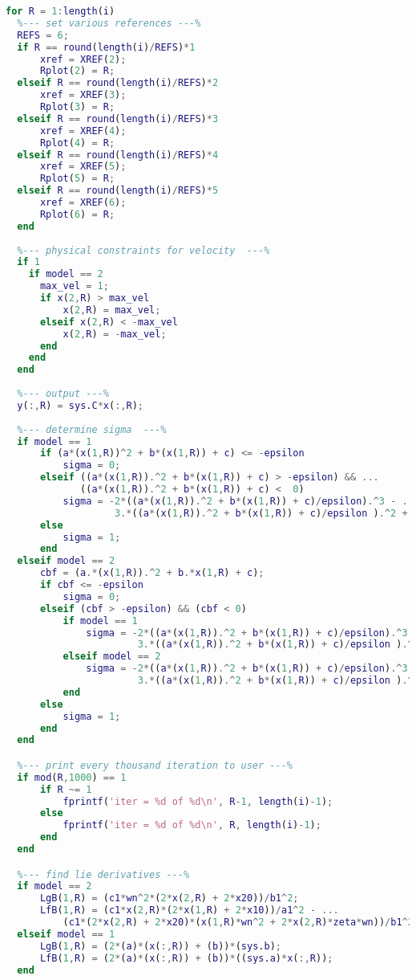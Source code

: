 \begin{lstlisting}[language=matlab]
for R = 1:length(i)
  %--- set various references ---%
  REFS = 6;
  if R == round(length(i)/REFS)*1
      xref = XREF(2);
      Rplot(2) = R;
  elseif R == round(length(i)/REFS)*2
      xref = XREF(3);
      Rplot(3) = R;
  elseif R == round(length(i)/REFS)*3
      xref = XREF(4);
      Rplot(4) = R;
  elseif R == round(length(i)/REFS)*4
      xref = XREF(5);
      Rplot(5) = R;
  elseif R == round(length(i)/REFS)*5
      xref = XREF(6);
      Rplot(6) = R;
  end
  
  %--- physical constraints for velocity  ---%
  if 1
    if model == 2
      max_vel = 1;
      if x(2,R) > max_vel
          x(2,R) = max_vel;
      elseif x(2,R) < -max_vel
          x(2,R) = -max_vel;
      end
    end
  end
 
  %--- output ---%
  y(:,R) = sys.C*x(:,R);
  
  %--- determine sigma  ---% 
  if model == 1
      if (a*(x(1,R))^2 + b*(x(1,R)) + c) <= -epsilon
          sigma = 0;
      elseif ((a*(x(1,R)).^2 + b*(x(1,R)) + c) > -epsilon) && ...
             ((a*(x(1,R)).^2 + b*(x(1,R)) + c) <  0)
          sigma = -2*((a*(x(1,R)).^2 + b*(x(1,R)) + c)/epsilon).^3 - ...
                   3.*((a*(x(1,R)).^2 + b*(x(1,R)) + c)/epsilon ).^2 + 1;
      else
          sigma = 1;
      end
  elseif model == 2
      cbf = (a.*(x(1,R)).^2 + b.*x(1,R) + c);
      if cbf <= -epsilon
          sigma = 0;
      elseif (cbf > -epsilon) && (cbf < 0)
          if model == 1
              sigma = -2*((a*(x(1,R)).^2 + b*(x(1,R)) + c)/epsilon).^3 - ...
                       3.*((a*(x(1,R)).^2 + b*(x(1,R)) + c)/epsilon ).^2 + 1;
          elseif model == 2
              sigma = -2*((a*(x(1,R)).^2 + b*(x(1,R)) + c)/epsilon).^3 - ...
                       3.*((a*(x(1,R)).^2 + b*(x(1,R)) + c)/epsilon ).^2 + 1;
          end
      else
          sigma = 1;
      end 
  end

  %--- print every thousand iteration to user ---%
  if mod(R,1000) == 1 
      if R ~= 1
          fprintf('iter = %d of %d\n', R-1, length(i)-1);
      else
          fprintf('iter = %d of %d\n', R, length(i)-1);
      end
  end

  %--- find lie derivatives ---%
  if model == 2
      LgB(1,R) = (c1*wn^2*(2*x(2,R) + 2*x20))/b1^2;
      LfB(1,R) = (c1*x(2,R)*(2*x(1,R) + 2*x10))/a1^2 - ...
          (c1*(2*x(2,R) + 2*x20)*(x(1,R)*wn^2 + 2*x(2,R)*zeta*wn))/b1^2; 
  elseif model == 1
      LgB(1,R) = (2*(a)*(x(:,R)) + (b))*(sys.b);
      LfB(1,R) = (2*(a)*(x(:,R)) + (b))*((sys.a)*x(:,R));
  end
  

\end{lstlisting}
